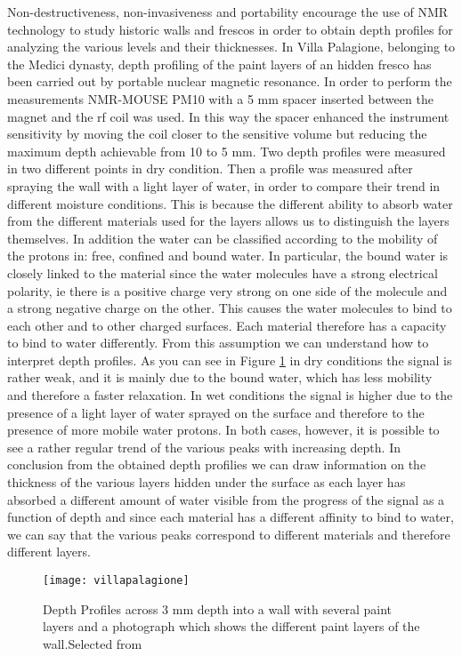 \documentclass[a4paper,11pt]{report}
\begin{document}
Non-destructiveness, non-invasiveness and portability encourage the use of NMR technology to study historic walls and frescos in order to obtain depth profiles for analyzing the various levels and their thicknesses. In Villa Palagione, belonging to the Medici dynasty, depth profiling of the paint layers of an hidden fresco has been carried out by portable nuclear magnetic resonance\cite{cinquefresco}.
In order to perform the measurements NMR-MOUSE PM10 with a 5 mm spacer inserted between the magnet and the rf coil was used.
In this way the spacer enhanced the instrument sensitivity by moving the coil closer to the sensitive volume but reducing the maximum depth achievable from 10 to 5 mm. 
Two depth profiles were measured in two different points in dry condition. Then a profile was measured after spraying the wall with a light layer of water, in order to compare their trend in different moisture conditions. 
This is because the different ability to absorb water from the different materials used for the layers allows us to distinguish the layers themselves. In addition the water can be classified according to the mobility of the protons in: free, confined and bound water. In particular, the bound water is closely linked to the material since the water molecules have a strong electrical polarity, ie there is a positive charge very strong on one side of the molecule and a strong negative charge on the other. This causes the water molecules to bind to each other and to other charged surfaces. Each material therefore has a capacity to bind to water differently. From this assumption we can understand how to interpret depth profiles. 
As you can see in Figure \ref{villapalagione} in dry conditions the signal is rather weak, and it is mainly due to the bound water, which has less mobility and therefore a faster relaxation. In wet conditions the signal is higher due to the presence of a light layer of water sprayed on the surface and therefore to the presence of more mobile water protons. In both cases, however, it is possible to see a rather regular trend of the various peaks with increasing depth. In conclusion from the obtained depth profilies we can draw information on the thickness of the various layers hidden under the surface as each layer has absorbed a different amount of water visible from the progress of the signal as a function of depth and since each material has a different affinity to bind to water, we can say that the various peaks correspond to different materials and therefore different layers. 
\begin{figure}[h]
	\centering
	\texttt{[image: villapalagione]}
	\caption{Depth Profiles across 3 mm depth into a wall with several paint layers and a photograph which shows the different paint layers of the wall.Selected from \cite{cinquefresco}} \label{villapalagione}
\end{figure}
\end{document}
